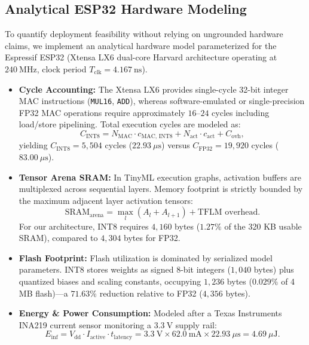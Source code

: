 \subsection{Analytical ESP32 Hardware Modeling}
To quantify deployment feasibility without relying on ungrounded hardware claims, we implement an analytical hardware model parameterized for the Espressif ESP32 (Xtensa LX6 dual-core Harvard architecture operating at $240\ \text{MHz}$, clock period $T_{\text{clk}} = 4.167\ \text{ns}$).
\begin{itemize}
    \item \textbf{Cycle Accounting:} The Xtensa LX6 provides single-cycle 32-bit integer MAC instructions (\texttt{MUL16}, \texttt{ADD}), whereas software-emulated or single-precision FP32 MAC operations require approximately $16\text{--}24$ cycles including load/store pipelining. Total execution cycles are modeled as:
    \begin{equation}
    C_{\text{INT8}} = N_{\text{MAC}} \cdot c_{\text{MAC, INT8}} + N_{\text{act}} \cdot c_{\text{act}} + C_{\text{ovh}},
    \end{equation}
    yielding $C_{\text{INT8}} = 5,504$ cycles ($22.93\ \mu\text{s}$) versus $C_{\text{FP32}} = 19,920$ cycles ($83.00\ \mu\text{s}$).
    \item \textbf{Tensor Arena SRAM:} In TinyML execution graphs, activation buffers are multiplexed across sequential layers. Memory footprint is strictly bounded by the maximum adjacent layer activation tensors:
    \begin{equation}
    \text{SRAM}_{\text{arena}} = \max_l (A_l + A_{l+1}) + \text{TFLM overhead}.
    \end{equation}
    For our architecture, INT8 requires $4,160$ bytes ($1.27\%$ of the 320 KB usable SRAM), compared to $4,304$ bytes for FP32.
    \item \textbf{Flash Footprint:} Flash utilization is dominated by serialized model parameters. INT8 stores weights as signed 8-bit integers ($1,040$ bytes) plus quantized biases and scaling constants, occupying $1,236$ bytes ($0.029\%$ of 4 MB flash)—a $71.63\%$ reduction relative to FP32 ($4,356$ bytes).
    \item \textbf{Energy & Power Consumption:} Modeled after a Texas Instruments INA219 current sensor monitoring a $3.3\ \text{V}$ supply rail:
    \begin{equation}
    E_{\text{inf}} = V_{\text{dd}} \cdot I_{\text{active}} \cdot t_{\text{latency}} = 3.3\ \text{V} \times 62.0\ \text{mA} \times 22.93\ \mu\text{s} = 4.69\ \mu\text{J}.
    \end{equation}
\end{itemize}
